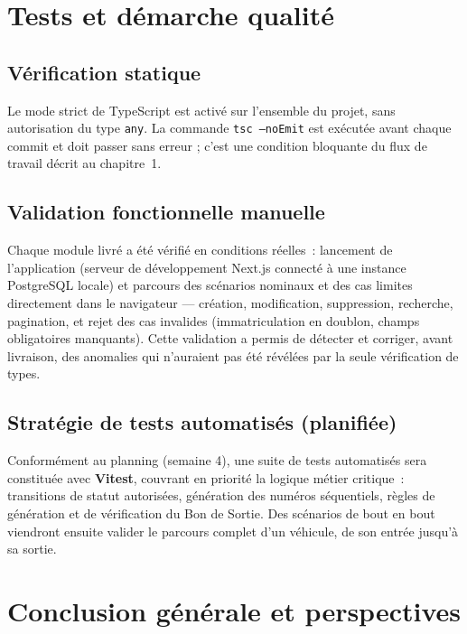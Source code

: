 \documentclass[11pt,a4paper]{report}
\begin{document}
\chapter{Tests et démarche qualité}

\section{Vérification statique}

Le mode strict de TypeScript est activé sur l'ensemble du projet, sans autorisation du
type \texttt{any}. La commande \texttt{tsc --noEmit} est exécutée avant chaque commit et
doit passer sans erreur ; c'est une condition bloquante du flux de travail décrit au
chapitre~1.

\section{Validation fonctionnelle manuelle}

Chaque module livré a été vérifié en conditions réelles~: lancement de l'application
(serveur de développement Next.js connecté à une instance PostgreSQL locale) et parcours
des scénarios nominaux et des cas limites directement dans le navigateur --- création,
modification, suppression, recherche, pagination, et rejet des cas invalides
(immatriculation en doublon, champs obligatoires manquants). Cette validation a permis de
détecter et corriger, avant livraison, des anomalies qui n'auraient pas été révélées par
la seule vérification de types.

\section{Stratégie de tests automatisés (planifiée)}

Conformément au planning (semaine 4), une suite de tests automatisés sera constituée avec
\textbf{Vitest}, couvrant en priorité la logique métier critique~: transitions de statut
autorisées, génération des numéros séquentiels, règles de génération et de vérification du
Bon de Sortie. Des scénarios de bout en bout viendront ensuite valider le parcours complet
d'un véhicule, de son entrée jusqu'à sa sortie.

\chapter{Conclusion générale et perspectives}
\end{document}
